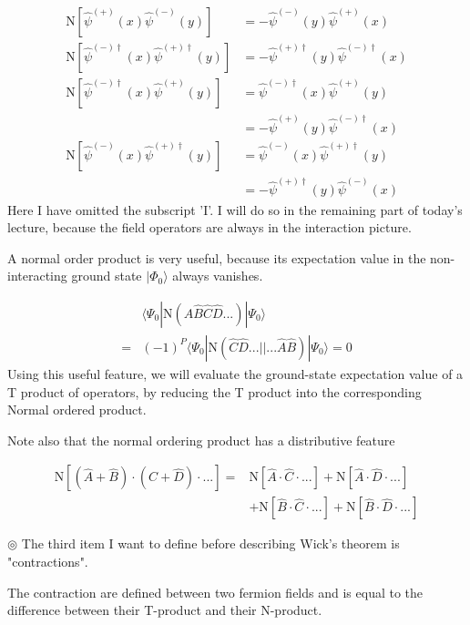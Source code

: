 \begin{align}
\mathrm{N}[\hat \psi^{(+)}(x)\hat \psi^{(-)}(y)]&=-\hat \psi^{(-)}(y)\hat \psi^{(+)}(x) \nonumber \\
\mathrm{N}[\hat \psi^{(-)\dagger}(x)\hat \psi^{(+)\dagger}(y)]&=-\hat \psi^{(+)\dagger}(y)\hat \psi^{(-)\dagger}(x) \nonumber \\
\mathrm{N}[\hat \psi^{(-)\dagger}(x)\hat \psi^{(+)}(y)]&=\hat \psi^{(-)\dagger}(x)\hat \psi^{(+)}(y) \nonumber \\
&=-\hat \psi^{(+)}(y)\hat \psi^{(-)\dagger}(x) \nonumber \\
\mathrm{N}[\hat \psi^{(-)}(x)\hat \psi^{(+)\dagger}(y)]&=\hat \psi^{(-)}(x)\hat \psi^{(+)\dagger}(y) \nonumber \\
&=-\hat \psi^{(+)\dagger}(y)\hat \psi^{(-)}(x) \nonumber 
\end{align}
Here I have omitted the subscript 'I'. I will do so in the remaining part of today's lecture, because the field operators are always in the interaction picture.

A normal order product is very useful, because its expectation value in the non-interacting ground state $|\Phi_0\rangle$ always vanishes.

\begin{align}
&\langle\Psi_0|\mathrm{N}(\hat{A}\hat{B}\hat{C}\hat{D}...)|\Psi_0\rangle \nonumber \\
=&(-1)^P\langle\Psi_0|\mathrm{N}(\hat{C}\hat{D}...||...\hat{A}\hat{B})|\Psi_0\rangle=0 \nonumber
\end{align}
Using this useful feature, we will evaluate the ground-state expectation value of a T product of operators, by reducing the T product into the corresponding Normal ordered product.

Note also that the normal ordering product has a distributive feature

\begin{align}
\mathrm{N}[(\hat{A}+\hat{B})\cdot(\hat{C}+\hat{D})\cdot...]=&\mathrm{N}[\hat{A}\cdot\hat{C}\cdot...]+\mathrm{N}[\hat{A}\cdot\hat{D}\cdot...] \nonumber \\
&+\mathrm{N}[\hat{B}\cdot\hat{C}\cdot...]+\mathrm{N}[\hat{B}\cdot\hat{D}\cdot...] \nonumber
\end{align}

$\circledcirc$ The third item I want to define before describing Wick's theorem is "contractions". 


The contraction are defined between two fermion fields and is equal to the difference between their T-product and their N-product.

